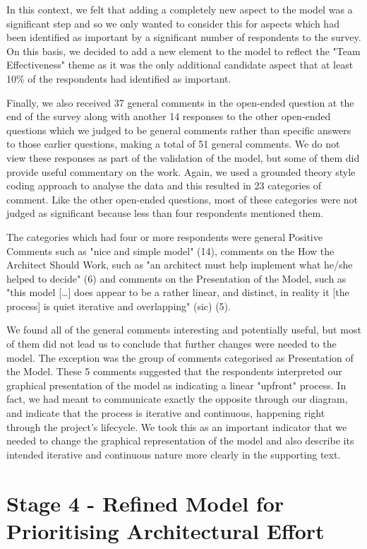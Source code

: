 In this context, we felt that adding a completely new aspect to the model was a significant step and so we only wanted to consider this for aspects which had been identified as important by a significant number of respondents to the survey.  On this basis, we decided to add a new element to the model to reflect the "Team Effectiveness" theme as it was the only additional candidate aspect that at least 10\% of the respondents had identified as important.

Finally, we also received 37 general comments in the open-ended question at the end of the survey along with another 14 responses to the other open-ended questions which we judged to be general comments rather than specific answers to those earlier questions, making a total of 51 general comments.  We do not view these responses as part of the validation of the model, but some of them did provide useful commentary on the work.  Again, we used a grounded theory style coding approach to analyse the data and this resulted in 23 categories of comment.  Like the other open-ended questions, most of these categories were not judged as significant because less than four respondents mentioned them.

The categories which had four or more respondents were general Positive Comments such as "nice and simple model" (14), comments on the How the Architect Should Work, such as "an architect must help implement what he/she helped to decide" (6) and comments on the Presentation of the Model, such as "this model [\ldots] does appear to be a rather linear, and distinct,  in reality it [the process] is quiet iterative and overlapping" (sic) (5).

We found all of the general comments interesting and potentially useful, but most of them did not lead us to conclude that further changes were needed to the model.  The exception was the group of comments categorised as Presentation of the Model.  These 5 comments suggested that the respondents interpreted our graphical presentation of the model as indicating a linear "upfront" process.  In fact, we had meant to communicate exactly the opposite through our diagram, and indicate that the process is iterative and continuous, happening right through the project's lifecycle.  We took this as an important indicator that we needed to change the graphical representation of the model and also describe its intended iterative and continuous nature more clearly in the supporting text.

\section{Stage 4 - Refined Model for Prioritising Architectural Effort}
\label{sec:refined-model}

